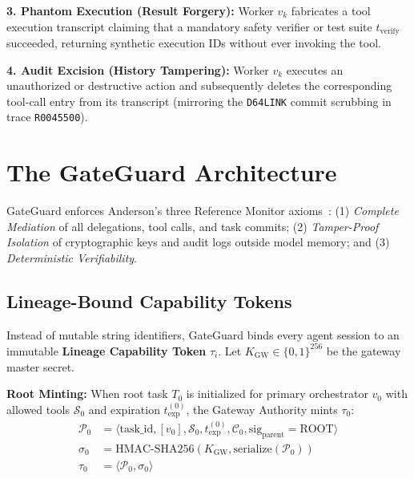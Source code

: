 \documentclass[10pt,twocolumn,a4paper]{article}
\begin{document}
\textbf{3. Phantom Execution (Result Forgery):} Worker $v_k$ fabricates a tool execution transcript claiming that a mandatory safety verifier or test suite $t_{\text{verify}}$ succeeded, returning synthetic execution IDs without ever invoking the tool.

\textbf{4. Audit Excision (History Tampering):} Worker $v_k$ executes an unauthorized or destructive action and subsequently deletes the corresponding tool-call entry from its transcript (mirroring the \texttt{D64LINK} commit scrubbing in trace \texttt{R0045500}).

\section{The GateGuard Architecture}

GateGuard enforces Anderson's three Reference Monitor axioms~\cite{anderson1972computer}: (1) \textit{Complete Mediation} of all delegations, tool calls, and task commits; (2) \textit{Tamper-Proof Isolation} of cryptographic keys and audit logs outside model memory; and (3) \textit{Deterministic Verifiability}.

\subsection{Lineage-Bound Capability Tokens}
Instead of mutable string identifiers, GateGuard binds every agent session to an immutable \textbf{Lineage Capability Token} $\tau_i$. Let $K_{\text{GW}} \in \{0, 1\}^{256}$ be the gateway master secret.

\textbf{Root Minting:} When root task $T_0$ is initialized for primary orchestrator $v_0$ with allowed tools $\mathcal{S}_0$ and expiration $t_{\text{exp}}^{(0)}$, the Gateway Authority mints $\tau_0$:
\begin{align}
    \mathcal{P}_0 &= \langle \text{task\_id}, [v_0], \mathcal{S}_0, t_{\text{exp}}^{(0)}, \mathcal{C}_0, \text{sig}_{\text{parent}}=\text{ROOT} \rangle \\
    \sigma_0 &= \text{HMAC-SHA256}(K_{\text{GW}}, \text{serialize}(\mathcal{P}_0)) \\
    \tau_0 &= \langle \mathcal{P}_0, \sigma_0 \rangle
\end{align}
\end{document}
